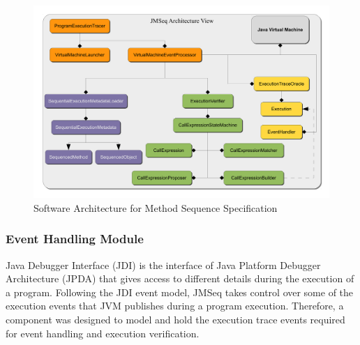 \begin{figure}[t]
\begin{center}
  \includegraphics[scale=0.35]{images/arch-diagram}
  \caption{Software Architecture for Method Sequence Specification}
  \label{fig:arch-diag}
\end{center}
\end{figure}


\subsubsection{Event Handling Module} \label{sec:event_handling}
Java Debugger Interface (JDI) is the interface
of Java Platform Debugger Architecture (JPDA) that gives access to different details during the execution of a program.
Following the JDI event model, JMSeq takes control over some of the
execution events that JVM publishes during a program execution. Therefore, a
component was designed to model and hold the execution trace events required
for event handling and execution verification.

